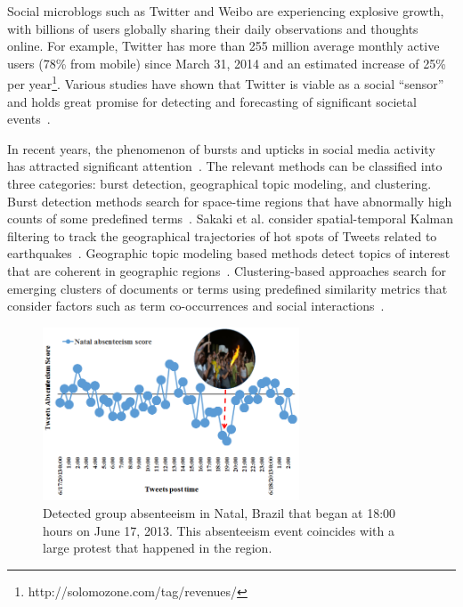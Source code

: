 Social microblogs such as Twitter and Weibo are experiencing explosive growth, with billions of users globally sharing their daily observations and thoughts online. For example, Twitter has more than 255 million average monthly active users (78\% from mobile) since March 31, 2014 and an estimated increase of 25\% per year\footnote{http://solomozone.com/tag/revenues/}. Various studies have shown that Twitter is viable as a social ``sensor'' and holds great promise for detecting and forecasting of significant societal events~\cite{sakaki2010earthquake, bugel2013multilingual}.

In recent years, the phenomenon of bursts and upticks in social media activity has attracted significant attention~\cite{sakaki2010earthquake, lappas2009burstiness, lappas2012spatiotemporal, yin2011geographical, hong2012discovering, eisenstein2010latent, teitler2008newsstand, weng2011event, sayyadi2009event, watanabe2011jasmine, aggarwal2012event}. The relevant methods can be classified into three categories: burst detection, geographical topic modeling, and clustering. Burst detection methods search for space-time regions that have abnormally high counts of some predefined terms~\cite{lappas2009burstiness, lappas2012spatiotemporal}. Sakaki et al. consider spatial-temporal Kalman filtering to track the geographical trajectories of hot spots of Tweets related to earthquakes~\cite{sakaki2010earthquake}. Geographic topic modeling based methods detect topics of interest that are coherent in geographic regions~\cite{yin2011geographical, hong2012discovering, eisenstein2010latent}. Clustering-based approaches search for emerging clusters of documents or terms using predefined similarity metrics that consider factors such as term co-occurrences and social interactions~\cite{teitler2008newsstand, weng2011event, sayyadi2009event, watanabe2011jasmine, aggarwal2012event}.

\begin{figure}[t]
\centering
\includegraphics[width=3in]{figures/Natal_example1.png}
\caption{Detected group absenteeism in Natal, Brazil that began at 18:00 hours on June 17, 2013.
This absenteeism event coincides with a large protest that happened in the region.}
\label{fig:natal-protest}
\end{figure}


